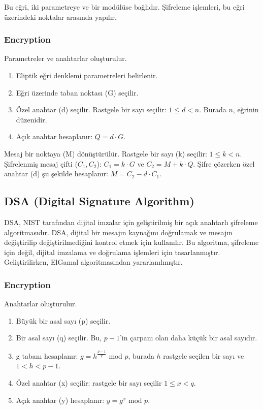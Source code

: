 Bu eğri, iki parametreye ve bir modülüse bağlıdır. Şifreleme işlemleri, bu eğri üzerindeki noktalar arasında yapılır.

\subsubsection{Encryption}

Parametreler ve anahtarlar oluşturulur.

\begin{enumerate}
    \item Eliptik eğri denklemi parametreleri belirlenir.
    \item Eğri üzerinde taban noktası (G) seçilir.
    \item Özel anahtar (d) seçilir. Rastgele bir sayı seçilir: $1 \leq d < n$. Burada $n$, eğrinin düzenidir.
    \item Açık anahtar hesaplanır: $Q = d \cdot G$.
\end{enumerate}

Mesaj bir noktaya (M) dönüştürülür. Rastgele bir sayı (k) seçilir: $1 \leq k < n$. Şifrelenmiş mesaj çifti ($C_1, C_2$): $C_1 = k \cdot G$ ve $C_2 = M + k \cdot Q$. Şifre çözerken özel anahtar (d) şu şekilde hesaplanır: $M = C_2 - d \cdot C_1$.

\newpage

\subsection{DSA (Digital Signature Algorithm)}

DSA, NIST tarafından dijital imzalar için geliştirilmiş bir açık anahtarlı şifreleme algoritmasıdır. DSA, dijital bir mesajın kaynağını doğrulamak ve mesajın değiştirilip değiştirilmediğini kontrol etmek için kullanılır. Bu algoritma, şifreleme için değil, dijital imzalama ve doğrulama işlemleri için tasarlanmıştır. Geliştirilirken, ElGamal algoritmasından yararlanılmıştır. 

\subsubsection{Encryption}

Anahtarlar oluşturulur.

\begin{enumerate}
    \item Büyük bir asal sayı (p) seçilir.
    \item Bir asal sayı (q) seçilir. Bu, $p - 1$'in çarpanı olan daha küçük bir asal sayıdır.
    \item g tabanı hesaplanır: $g = h^{\frac{p - 1}{q}} \text{ mod } p$, burada $h$ rastgele seçilen bir sayı ve $1 < h < p - 1$.
    \item Özel anahtar (x) seçilir: rastgele bir sayı seçilir $1 \leq x < q$.
    \item Açık anahtar (y) hesaplanır: $y = g^x \text{ mod } p$.
\end{enumerate}

